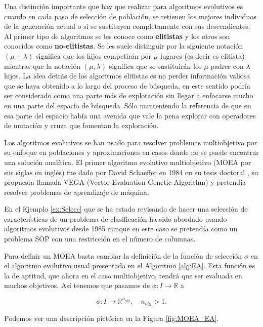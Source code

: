 Una distinción importante que hay que realizar para algoritmos evolutivos es cuando en cada paso de selección de población, se retienen los mejores individuos de la generación actual o si se sustituyen completamente con sus descendientes. Al primer tipo de algoritmos se les conoce como \textbf{elitistas} y los otros son conocidos como \textbf{no-elitistas}. Se les suele distinguir por la siguiente notación $(\mu+\lambda)$ significa que los hijos competirán por $\mu$ lugares (es decir es elitista) mientras que la notación $(\mu,\lambda)$ significa que se sustituirán los $\mu$ padres con $\lambda$ hijos. La idea detrás de los algoritmos elitistas es no perder información valiosa que se haya obtenido a lo largo del proceso de búsqueda, en este sentido podría ser considerado como una parte más de explotación sin llegar a enfocarse mucho en una parte del espacio de búsqueda. Sólo manteniendo la referencia de que en esa parte del espacio había una avenida que vale la pena explorar con operadores de mutación y cruza que fomentan la exploración.
    
Los algoritmos evolutivos se han usado para resolver problemas multiobjetivo por su enfoque en poblaciones y aproximaciones en casos donde no se puede encontrar una solución analítica. El primer algoritmo evolutivo multiobjetivo (MOEA por sus siglas en inglés) fue dado por David Schaeffer en 1984 en su tesis doctoral \cite{schafferMultipleObjectiveOptimization1984}, su propuesta llamada VEGA (Vector Evaluation Genetic Algorithm) y pretendía resolver problemas de aprendizaje de máquina.

En el Ejemplo \ref{ex:Selecc} que se ha estado revisando de hacer una selección de características de un problema de clasificación  ha sido abordado usando algoritmos evolutivos desde 1985 \cite{SIEDLECKI1989335} aunque en este caso se pretendía como un problema SOP con una restricción en el número de columnas. 


Para definir un MOEA basta cambiar la definición de la función de selección $\phi$ en el algoritmo evolutivo usual presentada en el Algoritmo \ref{alg:EA}. Esta función es la de aptitud, que ahora en el caso multiobjetivo, tendrá que ser evaluada en muchos objetivos. Así tenemos que pasamos de $\phi:I\rightarrow \mathbb{R}$ a

$$\phi:I\rightarrow \mathbb{R}^{n_{obj}}, \quad n_{obj}>1.$$


Podemos ver una descripción pictórica en la Figura \ref{fig:MOEA_EA}.

